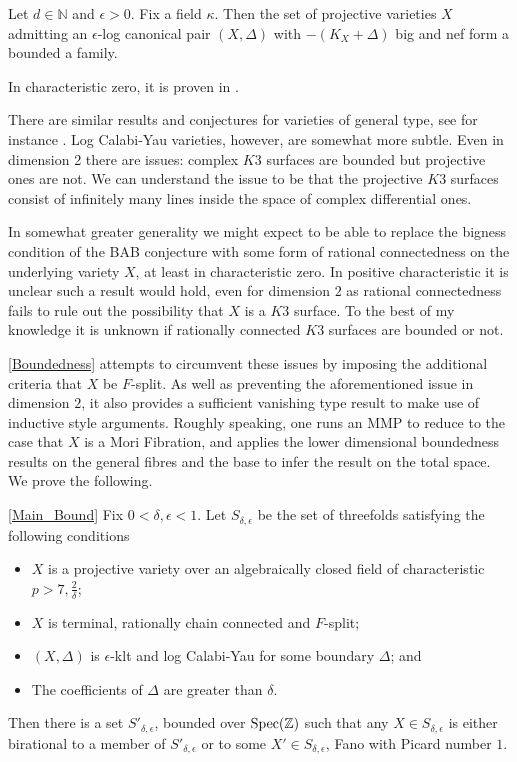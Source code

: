 \documentclass[a4paper,12pt]{book}
\begin{document}
	\begin{conjecture*}
		Let $d \in \mathbb{N}$ and $\epsilon > 0$. Fix a field $\kappa$. Then the set of projective varieties $X$ admitting an $\epsilon$-log canonical pair $(X,\Delta)$ with $-(K_{X}+\Delta)$ big and nef form a bounded a family.
	\end{conjecture*}	
	
	In characteristic zero, it is proven in \cite[Theorem 1.1]{birkar2016singularities}.
	
	There are similar results and conjectures for varieties of general type, see for instance \cite{HMX18}. Log Calabi-Yau varieties, however, are somewhat more subtle. Even in dimension 2 there are issues: complex $K3$ surfaces are bounded but projective ones are not. We can understand the issue to be that the projective $K3$ surfaces consist of infinitely many lines inside the space of complex differential ones.
	
	In somewhat greater generality we might expect to be able to replace the bigness condition of the BAB conjecture with some form of rational connectedness on the underlying variety $X$, at least in characteristic zero. In positive characteristic it is unclear such a result would hold, even for dimension $2$ as rational connectedness fails to rule out the possibility that $X$ is a $K3$ surface. To the best of my knowledge it is unknown if rationally connected $K3$ surfaces are bounded or not.
	
	\autoref{Boundedness} attempts to circumvent these issues by imposing the additional criteria that $X$ be $F$-split. As well as preventing the aforementioned issue in dimension $2$, it also provides a sufficient vanishing type result to make use of inductive style arguments. Roughly speaking, one runs an MMP to reduce to the case that $X$ is a Mori Fibration, and applies the lower dimensional boundedness results on the general fibres and the base to infer the result on the total space. We prove the following.
	
	\begin{theo}\autoref{Main_Bound}
		Fix $0 < \delta, \epsilon <1$. Let $S_{\delta,\epsilon}$ be the set of threefolds satisfying the following conditions
		\begin{itemize}
			\item $X$ is a projective variety over an algebraically closed field of characteristic $p >7, \frac{2}{\delta}$;
			\item $X$ is terminal, rationally chain connected and $F$-split;
			\item $(X,\Delta)$ is $\epsilon$-klt and log Calabi-Yau for some boundary $\Delta$; and
			\item The coefficients of $\Delta$ are greater than $\delta$.
		\end{itemize}
		
		Then there is a set $S'_{\delta,\epsilon}$, bounded over $\textup{Spec}(\mathbb{Z})$ such that any $X\in S_{\delta,\epsilon}$ is either birational to a member of $S'_{\delta,\epsilon}$ or to some $X'\in S_{\delta,\epsilon}$, Fano with Picard number $1$. 
	\end{theo}
	
\end{document}
